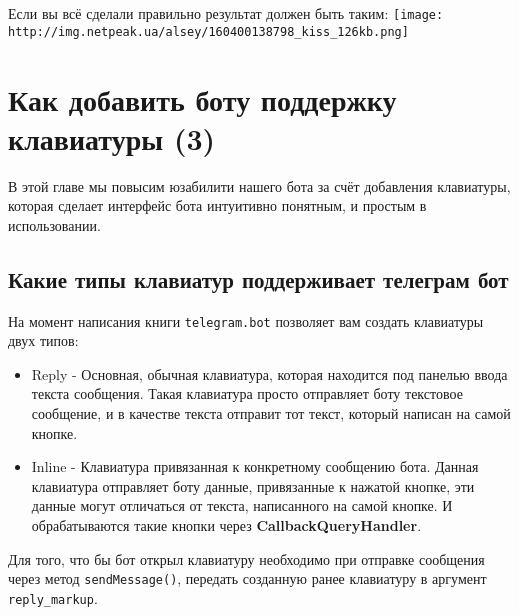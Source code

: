\documentclass[
]{book}
\providecommand{\tightlist}{%
  \setlength{\itemsep}{0pt}\setlength{\parskip}{0pt}}
\begin{document}
Если вы всё сделали правильно результат должен быть таким:
\texttt{[image: http://img.netpeak.ua/alsey/160400138798\_kiss\_126kb.png]}

\hypertarget{ux43aux430ux43a-ux434ux43eux431ux430ux432ux438ux442ux44c-ux431ux43eux442ux443-ux43fux43eux434ux434ux435ux440ux436ux43aux443-ux43aux43bux430ux432ux438ux430ux442ux443ux440ux44b-3}{%
\chapter{Как добавить боту поддержку клавиатуры (3)}\label{ux43aux430ux43a-ux434ux43eux431ux430ux432ux438ux442ux44c-ux431ux43eux442ux443-ux43fux43eux434ux434ux435ux440ux436ux43aux443-ux43aux43bux430ux432ux438ux430ux442ux443ux440ux44b-3}}

В этой главе мы повысим юзабилити нашего бота за счёт добавления клавиатуры, которая сделает интерфейс бота интуитивно понятным, и простым в использовании.

\hypertarget{ux43aux430ux43aux438ux435-ux442ux438ux43fux44b-ux43aux43bux430ux432ux438ux430ux442ux443ux440-ux43fux43eux434ux434ux435ux440ux436ux438ux432ux430ux435ux442-ux442ux435ux43bux435ux433ux440ux430ux43c-ux431ux43eux442}{%
\section{Какие типы клавиатур поддерживает телеграм бот}\label{ux43aux430ux43aux438ux435-ux442ux438ux43fux44b-ux43aux43bux430ux432ux438ux430ux442ux443ux440-ux43fux43eux434ux434ux435ux440ux436ux438ux432ux430ux435ux442-ux442ux435ux43bux435ux433ux440ux430ux43c-ux431ux43eux442}}

На момент написания книги \texttt{telegram.bot} позволяет вам создать клавиатуры двух типов:

\begin{itemize}
\tightlist
\item
  Reply - Основная, обычная клавиатура, которая находится под панелью ввода текста сообщения. Такая клавиатура просто отправляет боту текстовое сообщение, и в качестве текста отправит тот текст, который написан на самой кнопке.
\item
  Inline - Клавиатура привязанная к конкретному сообщению бота. Данная клавиатура отправляет боту данные, привязанные к нажатой кнопке, эти данные могут отличаться от текста, написанного на самой кнопке. И обрабатываются такие кнопки через \textbf{CallbackQueryHandler}.
\end{itemize}

Для того, что бы бот открыл клавиатуру необходимо при отправке сообщения через метод \texttt{sendMessage()}, передать созданную ранее клавиатуру в аргумент \texttt{reply\_markup}.
\end{document}
